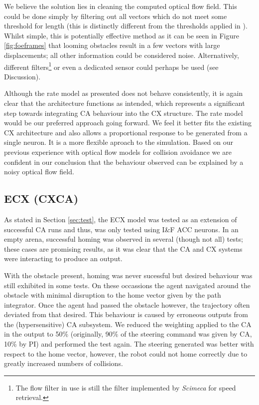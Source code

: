 \documentclass[a4paper,11pt,twoside,openright]{article}
\begin{document}
We believe the solution lies in cleaning the computed optical flow
field. This could be done simply by filtering out all vectors which do
not meet some threshold for length (this is distinctly different from
the thresholds applied in \cite{Mitchell2018}). Whilst simple, this is
potentially effective method as it can be seen in Figure
\ref{fig:foeframes} that looming obstacles result in a few vectors
with large displacements; all other information could be considered
noise. Alternatively, different filters\footnote{The flow filter in
  use is still the filter implemented by \textit{Scimeca} for speed
  retrieval\cite{Scimeca2017,Mitchell2018}. } or even a dedicated
sensor could perhaps be used (see Discussion).\newline\par

Although the rate model as presented does not behave consistently, it
is again clear that the architecture functions as intended, which
represents a significant step towards integrating CA behaviour into the
CX structure.  The rate model would be our preferred approach going
forward. We feel it better fits the existing CX architecture and also
allows a proportional response to be generated from a single
neuron. It is a more flexible aproach to the simulation. Based on our
previous experience with optical flow models for collision avoidance
we are confident in our conclusion that the behaviour observed can be
explained by a noisy optical flow field.

\subsection{ECX (CXCA)}
As stated in Section \ref{sec:test}, the ECX model was tested as an
extension of successful CA runs and thus, was only tested using I\&F
ACC neurons. In an empty arena, successful homing was observed in
several (though not all) tests; these cases are promising results, as
it was clear that the CA and CX systems were interacting to produce an
output. \newline\par

With the obstacle present, homing was never sucessful but desired
behaviour was still exhibited in some tests. On these occassions the
agent navigated around the obstacle with minimal disruption to the
home vector given by the path integrator. Once the agent had passed
the obstacle however, the trajectory often deviated from that
desired. This behaviour is caused by erroneous outputs from the
(hypersensitive) CA subsystem. We reduced the weighting applied to the
CA in the output to 50\% (originally, 90\% of the steering command was
given by CA, 10\% by PI) and performed the test again. The steering
generated was better with respect to the home vector, however, the
robot could not home correctly due to greatly increased numbers of
collisions.
\newline\par
\end{document}
